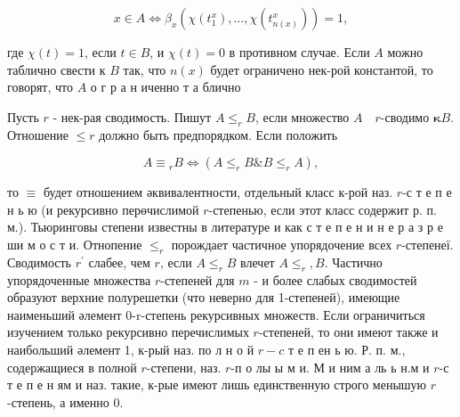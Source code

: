 \documentclass[10pt]{article}
\begin{document}
\[

x \in A \Leftrightarrow \beta_{x}\left(\chi\left(t_{1}^{x}\right), \ldots, \chi\left(t_{n(x)}^{x}\right)\right)=1,

\]



где $\chi(t)=1$, если $t \in B$, и $\chi(t)=0$ в противном случае. Если $A$ можно таблично свести к $B$ так, что $n(x)$ будет ограничено нек-рой константой, то говорят, что $A$ о г р а н иченно т а блично



Пусть $r$ - нек-рая сводимость. Пишут $A \leqslant_{r} B$, если множество $A \quad r$-сводимо $\boldsymbol{\kappa} B$. Отношение $\leqslant r$ должно быть предпорядком. Если положить



\[

A \equiv{ }_{r} B \Leftrightarrow\left(A \leqslant_{r} B \& B \leqslant_{r} A\right),

\]



то $\equiv$ будет отношением әквивалентности, отдельный класс к-рой наз. $r$-с т е п е н ь ю (и рекурсивно перөчислимой $r$-степенью, если этот класс содержит р. п. м.). Тьюринговы степени известны в литературе и как с т е п е н и н е р а з р е ши м о с т и. Отнопение $\leqslant_{r}$ порождает частичное упорядочение всех $r$-степенеї. Сводимость $r^{\prime}$ слабее, чем $r$, если $A \leqslant_{r} B$ влечет $A \leqslant_{r}, B$. Частично упорядоченные множества $r$-степеней для $m$ - и более слабых сводимостей образуют верхние полурешетки (что неверно для 1-степеней), имеющие наименьший әлемент 0-r-степень рекурсивных множеств. Если ограничиться изучением только рекурсивно перечислимых $r$-степеней, то они имеют также и наибольший әлемент 1, к-рый наз. по л н о й $r-c$ т е п ен ь ю. Р. п. м., содержащиеся в полной $r$-степени, наз. $r$-п о лы ы м и. М и ним а ль ь н.м и $r$-с т е п е н ям и наз. такие, к-рые имеют лишь единственную строго менышую $r$-степень, а именно 0.
\end{document}
